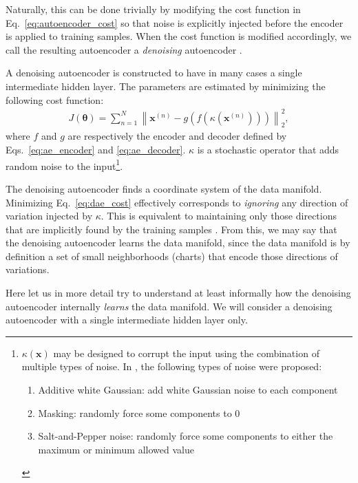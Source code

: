 \documentclass[dissertation,nocontribution,draft*]{aaltoseries}
\newcommand{\vect}[1]{\mathbf{#1}}
\newcommand{\vects}[1]{\boldsymbol{#1}}
\newcommand{\vx}[0]{\vect{x}}
\newcommand{\TT}[0]{{\vects{\theta}}}
\begin{document}
Naturally, this can be done trivially by modifying the cost
function in Eq.~\eqref{eq:autoencoder_cost} so that noise is
explicitly injected before the encoder is applied to
training samples.  When the cost function is modified
accordingly, we call the resulting autoencoder a
\textit{denoising} autoencoder \citep{Vincent2010}. 

A denoising autoencoder is constructed to have in many
cases a single intermediate hidden layer. The parameters
are estimated by minimizing the following cost function:
\begin{align}
    \label{eq:dae_cost}
    J(\TT) =  \sum_{n=1}^N \left\| \vx^{(n)} -
    g\left(f(\kappa(\vx^{(n)}))\right)
    \right\|_2^2,
\end{align}
where $f$ and $g$ are respectively the encoder and decoder
defined by Eqs.~\eqref{eq:ae_encoder} and
\eqref{eq:ae_decoder}.  $\kappa$ is a stochastic operator
that adds 
random noise to the input\footnote{
$\kappa(\vx)$ may be designed to corrupt the input using the
combination of multiple types of noise. In
\citep{Vincent2010}, the following types of noise were
proposed:
\begin{enumerate}
        \vspace{-5mm}
    \itemsep 0em
    \item Additive white Gaussian: add white Gaussian noise
        to each component
    \item Masking: randomly force some components to $0$
    \item Salt-and-Pepper noise: randomly force some
        components to either the maximum or minimum allowed
        value
\end{enumerate}
}.

The denoising autoencoder finds a coordinate system of the
data manifold.
Minimizing Eq.~\eqref{eq:dae_cost} effectively corresponds
to \textit{ignoring} any direction of variation injected by
$\kappa$. This is equivalent to maintaining only those
directions that are implicitly found by the training samples
\citep{Vincent2010}. From this, we may say that the
denoising autoencoder learns the data manifold, since the
data manifold is by definition a set of small
neighborhoods (charts) that encode those directions of
variations.

Here let us in more detail try to understand at least
informally how the denoising autoencoder internally
\textit{learns} the data manifold. We will consider a
denoising autoencoder with a single intermediate hidden
layer only.
\end{document}
